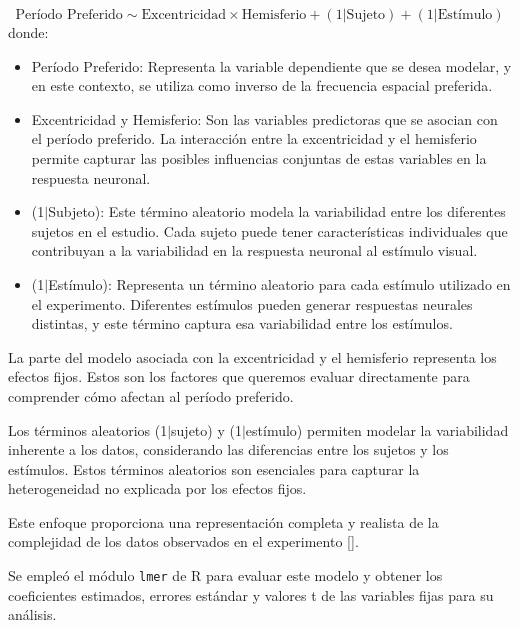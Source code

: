 \begin{equation}
	\text{Período Preferido} \sim  \text{Excentricidad} \times \text{Hemisferio} + (1|\text{Sujeto}) + (1|\text{Estímulo})	
	\label{mlm_pp}
\end{equation}
donde:
\begin{itemize}
	\item Período Preferido: Representa la variable dependiente que se desea modelar, y en este contexto, se utiliza como inverso de la frecuencia espacial preferida.
	
	\item Excentricidad y Hemisferio: Son las variables predictoras que se asocian con el período preferido. La interacción entre la excentricidad y el hemisferio permite capturar las posibles influencias conjuntas de estas variables en la respuesta neuronal.
	
	\item (1$|$Subjeto): Este término aleatorio modela la variabilidad entre los diferentes sujetos en el estudio. Cada sujeto puede tener características individuales que contribuyan a la variabilidad en la respuesta neuronal al estímulo visual.

	\item (1$|$Est\'imulo): Representa un término aleatorio para cada estímulo utilizado en el experimento. Diferentes estímulos pueden generar respuestas neurales distintas, y este término captura esa variabilidad entre los estímulos.
	
\end{itemize}

La parte del modelo asociada con la excentricidad y el hemisferio representa los efectos fijos. Estos son los factores que queremos evaluar directamente para comprender cómo afectan al período preferido.

Los términos aleatorios (1$|$sujeto) y (1$|$estímulo) permiten modelar la variabilidad inherente a los datos, considerando las diferencias entre los sujetos y los estímulos. Estos términos aleatorios son esenciales para capturar la heterogeneidad no explicada por los efectos fijos.

Este enfoque proporciona una representación completa y realista de la complejidad de los datos observados en el experimento [\cite{broderick_mapping_2022}].

Se empleó el módulo \texttt{lmer} de R para evaluar este modelo y obtener los coeficientes estimados, errores estándar y valores t de las variables fijas para su análisis.


